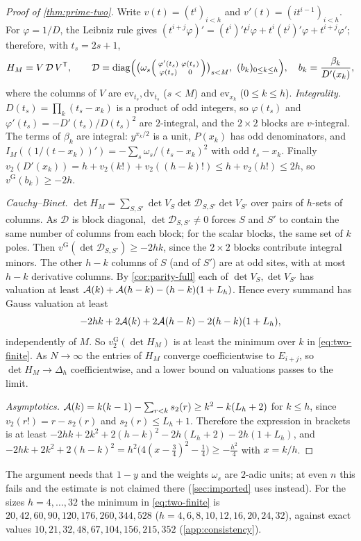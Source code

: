 \begin{proof}[Proof of \cref{thm:prime-two}]
Write $v(t)=(t^i)_{i<h}$ and $v'(t)=(it^{i-1})_{i<h}$. For $\varphi=1/D$, the Leibniz rule gives
$(t^{i+j}\varphi)'=(t^i)'t^j\varphi+t^i(t^j)'\varphi+t^{i+j}\varphi'$; therefore, with
$t_s=2s+1$,
\[
H_M=V\,\mathcal D\,V^{\mathsf T},\qquad
\mathcal D=\operatorname{diag}\Bigl(\bigl(\omega_s\begin{psmallmatrix}\varphi'(t_s)&\varphi(t_s)\\ \varphi(t_s)&0\end{psmallmatrix}\bigr)_{s<M},\ (b_k)_{0\le k\le h}\Bigr),
\quad b_k=\frac{\beta_k}{D'(x_k)},
\]
where the columns of $V$ are $\mathrm{ev}_{t_s},\mathrm{dv}_{t_s}$ ($s<M$) and $\mathrm{ev}_{x_k}$ ($0\le k\le h$).
\emph{Integrality.} $D(t_s)=\prod_k(t_s-x_k)$ is a product of odd integers, so $\varphi(t_s)$ and
$\varphi'(t_s)=-D'(t_s)/D(t_s)^2$ are $2$-integral, and the $2\times2$ blocks are $v$-integral. The terms
of $\beta_k$ are integral: $y^{x_k/2}$ is a unit, $P(x_k)$ has odd denominators, and
$I_M((1/(t-x_k))')=-\sum_s\omega_s/(t_s-x_k)^2$ with odd $t_s-x_k$. Finally
$v_2(D'(x_k))=h+v_2(k!)+v_2((h-k)!)\le h+v_2(h!)\le2h$, so $v^{\mathrm G}(b_k)\ge-2h$.

\emph{Cauchy--Binet.} $\det H_M=\sum_{S,S'}\det V_S\det\mathcal D_{S,S'}\det V_{S'}$ over pairs of $h$-sets of
columns. As $\mathcal D$ is block diagonal, $\det\mathcal D_{S,S'}\ne0$ forces $S$ and $S'$ to contain the
same number of columns from each block; for the scalar blocks, the same set of $k$ poles. Then
$v^{\mathrm G}(\det\mathcal D_{S,S'})\ge-2hk$, since the $2\times2$ blocks contribute integral minors.
The other $h-k$ columns of $S$ (and of $S'$) are at odd sites, with at most $h-k$ derivative columns.
By \cref{cor:parity-full} each of $\det V_S,\det V_{S'}$ has valuation at least
$\mathcal{A}(k)+\mathcal{A}(h-k)-(h-k)(1+L_h)$. Hence every summand has Gauss valuation at least
\[
-2hk+2\mathcal{A}(k)+2\mathcal{A}(h-k)-2(h-k)(1+L_h),
\]
independently of $M$. So $v_2^{\mathrm G}(\det H_M)$ is at least the minimum over $k$ in
\eqref{eq:two-finite}. As $N\to\infty$ the entries of $H_M$ converge coefficientwise to $E_{i+j}$,
so $\det H_M\to\Delta_h$ coefficientwise, and a lower bound on valuations passes to the limit.

\emph{Asymptotics.} $\mathcal{A}(k)=k(k-1)-\sum_{r<k}s_2(r)\ge k^2-k(L_h+2)$ for $k\le h$, since
$v_2(r!)=r-s_2(r)$ and $s_2(r)\le L_h+1$. Therefore the expression in brackets is at least
$-2hk+2k^2+2(h-k)^2-2h(L_h+2)-2h(1+L_h)$, and
$-2hk+2k^2+2(h-k)^2=h^2\bigl(4(x-\tfrac34)^2-\tfrac14\bigr)\ge-\tfrac{h^2}4$ with $x=k/h$.
\end{proof}

\begin{remark}
The argument needs that $1-y$ and the weights $\omega_s$ are $2$-adic units; at even $n$ this fails
and the estimate is not claimed there (\cref{sec:imported} uses \cite[Proposition~4.2]{Krisman2026units}
instead). For the sizes $h=4,\dots,32$ the minimum in \eqref{eq:two-finite} is
$20,42,60,90,120,176,260,344,528$ ($h=4,6,8,10,12,16,20,24,32$), against exact values
$10,21,32,48,67,104,156,215,352$ (\cref{app:consistency}).
\end{remark}
